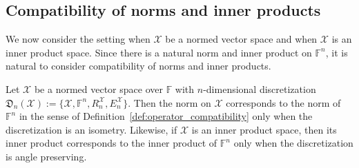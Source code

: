 \documentclass[a4paper]{paper}
\newcommand{\Discr}{\mathfrak{D}}
\newcommand{\VecSpace}[1]{\mathscr{#1}}
\newcommand{\Field}{\mathbb{F}}
\newcommand*{\EXT}[2]{\ensuremath{E_{#1}^{#2}}}
\newcommand*{\REST}[2]{\ensuremath{R_{#1}^{#2}}}
\newcommand*{\RnX}{\ensuremath{\REST{n}{\VecSpace{X}}}}
\newcommand*{\EnX}{\ensuremath{\EXT{n}{\VecSpace{X}}}}
\begin{document}
\subsection{Compatibility of norms and inner products}
We now consider the setting when $\VecSpace{X}$ be a normed vector space and when 
$\VecSpace{X}$ is an inner product space. Since there is a natural norm and inner product on
$\Field^{n}$, it is natural to consider compatibility of norms and inner products. 
\begin{theorem}\label{ThmNormInnerProd}
  Let $\VecSpace{X}$ be a normed vector space over $\Field$ with $n$-dimensional
  discretization $\Discr_{n}(\VecSpace{X}):=\{\VecSpace{X},\Field^{n},\RnX,\EnX\}$. 
  Then the norm on $\VecSpace{X}$ corresponds to the norm of $\Field^{n}$ 
  in the sense of Definition~\ref{def:operator_compatibility} only when the discretization is an isometry. 
  Likewise, if $\VecSpace{X}$ is an inner product space, then its inner product corresponds to the 
  inner product of $\Field^{n}$ only when the discretization is angle preserving.
\end{theorem}
\end{document}
